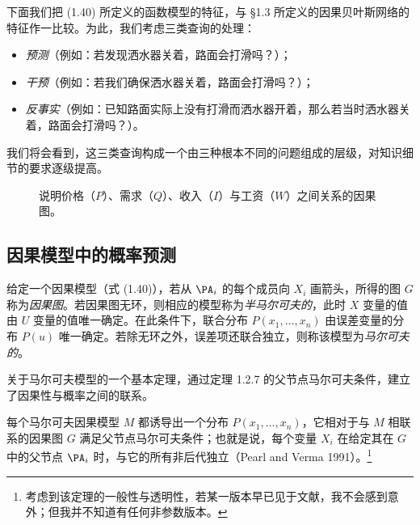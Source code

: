 下面我们把 \textup{(1.40)} 所定义的函数模型的特征，与 \S 1.3 所定义的因果贝叶斯网络的特征作一比较。为此，我们考虑三类查询的处理：
\begin{itemize}
\item \emph{预测}（例如：若发现洒水器关着，路面会打滑吗？）；
\item \emph{干预}（例如：若我们确保洒水器关着，路面会打滑吗？）；
\item \emph{反事实}（例如：已知路面实际上没有打滑而洒水器开着，那么若当时洒水器关着，路面会打滑吗？）。
\end{itemize}
我们将会看到，这三类查询构成一个由三种根本不同的问题组成的层级，对知识细节的要求逐级提高。

\begin{figure}[htbp]
\centering
{}
\caption{说明价格（$P$）、需求（$Q$）、收入（$I$）与工资（$W$）之间关系的因果图。}
\label{fig:1.5}
\end{figure}

\subsection{因果模型中的概率预测}

给定一个因果模型（式 \textup{(1.40)}），若从 $\PA_i$ 的每个成员向 $X_i$ 画箭头，所得的图 $G$ 称为\emph{因果图}。若因果图无环，则相应的模型称为\emph{半马尔可夫的}，此时 $X$ 变量的值由 $U$ 变量的值唯一确定。在此条件下，联合分布 $P(x_1,\dots,x_n)$ 由误差变量的分布 $P(u)$ 唯一确定。若除无环之外，误差项还联合独立，则称该模型为\emph{马尔可夫的}。

关于马尔可夫模型的一个基本定理，通过定理 1.2.7 的父节点马尔可夫条件，建立了因果性与概率之间的联系。

\begin{theorem}[因果马尔可夫条件]
每个马尔可夫因果模型 $M$ 都诱导出一个分布 $P(x_1,\dots,x_n)$，它相对于与 $M$ 相联系的因果图 $G$ 满足父节点马尔可夫条件；也就是说，每个变量 $X_i$ 在给定其在 $G$ 中的父节点 $\PA_i$ 时，与它的所有非后代独立（Pearl and Verma 1991）。\footnote{考虑到该定理的一般性与透明性，若某一版本早已见于文献，我不会感到意外；但我并不知道有任何非参数版本。}
\end{theorem}

